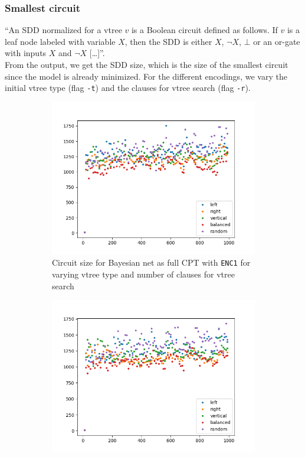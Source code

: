 \documentclass{article}
\begin{document}
\newpage

\subsubsection{Smallest circuit}
``An SDD normalized for a vtree $v$ is a Boolean circuit defined as follows. If $v$ is a leaf node labeled with variable $X$, then the SDD is either $X$, $\neg X$, $\bot$ or an or-gate with inputs $X$ and $\neg X$ [\dots]''\cite{shen}.\\
From the output, we get the SDD size, which is the size of the smallest circuit since the model is already minimized.
For the different encodings, we vary the initial vtree type (flag \texttt{-t}) and the clauses for vtree search (flag \texttt{-r}).


\begin{figure}[h]
  \centering
  \begin{subfigure}[b]{0.4\linewidth}
    \includegraphics[width=\linewidth]{images/enc1_full.png}
    \caption{Circuit size for Bayesian net as full CPT with \texttt{ENC1} for varying vtree type and number of clauses for vtree search}
  \end{subfigure}
    \begin{subfigure}[b]{0.4\linewidth}
    \includegraphics[width=\linewidth]{images/enc1_noisy.png}

\end{subfigure}
\end{figure}
\end{document}
